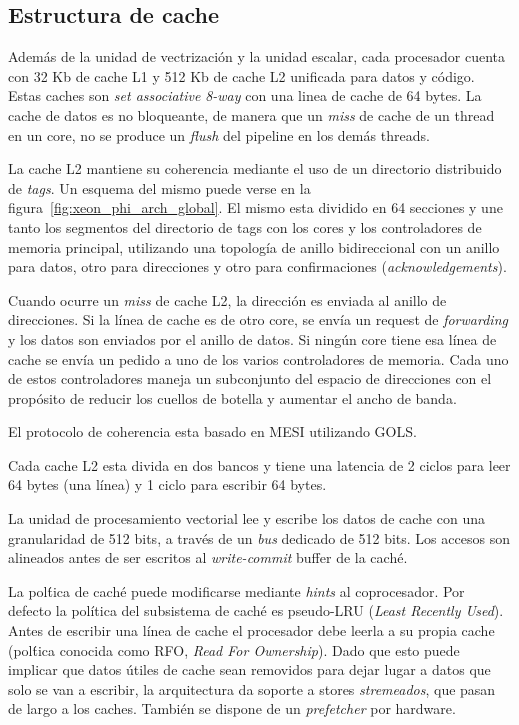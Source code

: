 \subsection{Estructura de cache}

Adem\'as de la unidad de vectrizaci\'on y la unidad escalar, cada procesador cuenta con 32 Kb de cache L1 y 512 Kb de cache
L2 unificada para datos y c\'odigo. Estas caches son \textit{set associative} \textit{8-way} con una linea de cache de 64 bytes. 
La cache de datos es no bloqueante, de manera que un \textit{miss} de cache de un thread en un core, 
no se produce un \textit{flush} del pipeline en los dem\'as threads.

La cache L2 mantiene su coherencia mediante el uso de un directorio distribuido de \textit{tags}. Un esquema del mismo puede
verse en la figura~\ref{fig:xeon_phi_arch_global}. El mismo esta dividido en 64 secciones y une tanto los segmentos del
directorio de tags con los cores y los controladores de memoria principal, utilizando una topolog\'ia de anillo bidireccional
con un anillo para datos, otro para direcciones y otro para confirmaciones (\textit{acknowledgements}).

Cuando ocurre un \textit{miss} de cache L2, la direcci\'on es enviada al anillo de direcciones. Si la l\'inea de cache
es de otro core, se env\'ia un request de \textit{forwarding} y los datos son enviados por el anillo de datos. Si ning\'un
core tiene esa l\'inea de cache se env\'ia un pedido a uno de los varios controladores de memoria. Cada uno de estos controladores
maneja un subconjunto del espacio de direcciones con el prop\'osito de reducir los cuellos de botella y aumentar el ancho de banda.

El protocolo de coherencia esta basado en MESI utilizando GOLS.

Cada cache L2 esta divida en dos bancos y tiene una latencia de 2 ciclos para leer 64 bytes (una l\'inea) y 1 ciclo para escribir 64 bytes.

La unidad de procesamiento vectorial lee y escribe los datos de cache con una granularidad de 512 bits, a trav\'es de un
\textit{bus} dedicado de 512 bits. Los accesos son alineados antes de ser escritos al \textit{write-commit} buffer de la
cach\'e.

La pol\'tica de cach\'e puede modificarse mediante \textit{hints} al coprocesador. Por defecto la pol\'itica del subsistema
de cach\'e es pseudo-LRU (\textit{Least Recently Used}). Antes de escribir una l\'inea de cache el procesador debe leerla a su propia
cache (pol\'tica conocida como RFO, \textit{Read For Ownership}). Dado que esto puede implicar que datos \'utiles de cache
sean removidos para dejar lugar a datos que solo se van a escribir, la arquitectura da soporte a stores \textit{stremeados},
que pasan de largo a los caches. Tambi\'en se dispone de un \textit{prefetcher} por hardware.

